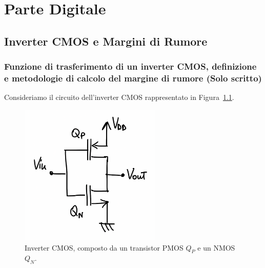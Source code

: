 \chapter{Parte Digitale}
\section{Inverter CMOS e Margini di Rumore}

\subsection{Funzione di trasferimento di un inverter CMOS, definizione e metodologie di calcolo del margine di rumore (Solo scritto)}

Consideriamo il circuito dell'inverter CMOS rappresentato in Figura~\ref{fig:inverter_cmos}.\\[2mm]
\begin{figure}[H]
    \centering
    \includegraphics[width=0.6\textwidth]{images/2.1.1.1.png}
    \caption{Inverter CMOS, composto da un transistor PMOS \(Q_P\) e un NMOS \(Q_N\).}
    \label{fig:inverter_cmos}
\end{figure}

